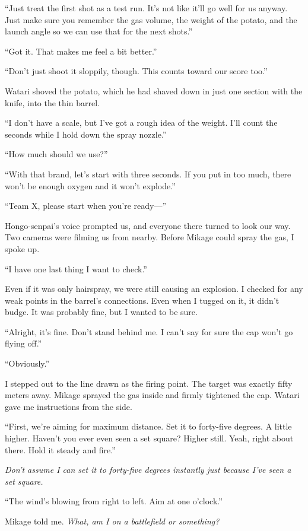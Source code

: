 \documentclass[
    a4paper,
    12pt,
    twoside,
    openany,
    UTF8,
    fontset=windows
]{ctexbook}
\begin{document}
``Just treat the first shot as a test run. It's not like it'll go well for us anyway. Just make sure you remember the gas volume, the weight of the potato, and the launch angle so we can use that for the next shots.''

``Got it. That makes me feel a bit better.''

``Don't just shoot it sloppily, though. This counts toward our score too.''

Watari shoved the potato, which he had shaved down in just one section with the knife, into the thin barrel.

``I don't have a scale, but I've got a rough idea of the weight. I'll count the seconds while I hold down the spray nozzle.''

``How much should we use?''

``With that brand, let's start with three seconds. If you put in too much, there won't be enough oxygen and it won't explode.''

``Team X, please start when you're ready---''

Hongo-senpai's voice prompted us, and everyone there turned to look our way. Two cameras were filming us from nearby. Before Mikage could spray the gas, I spoke up.

``I have one last thing I want to check.''

Even if it was only hairspray, we were still causing an explosion. I checked for any weak points in the barrel's connections. Even when I tugged on it, it didn't budge. It was probably fine, but I wanted to be sure.

``Alright, it's fine. Don't stand behind me. I can't say for sure the cap won't go flying off.''

``Obviously.''

I stepped out to the line drawn as the firing point. The target was exactly fifty meters away. Mikage sprayed the gas inside and firmly tightened the cap. Watari gave me instructions from the side.

``First, we're aiming for maximum distance. Set it to forty-five degrees. A little higher. Haven't you ever even seen a set square? Higher still. Yeah, right about there. Hold it steady and fire.''

\textit{Don't assume I can set it to forty-five degrees instantly just because I've seen a set square.}

``The wind's blowing from right to left. Aim at one o'clock.''

Mikage told me. \textit{What, am I on a battlefield or something?}
\end{document}
